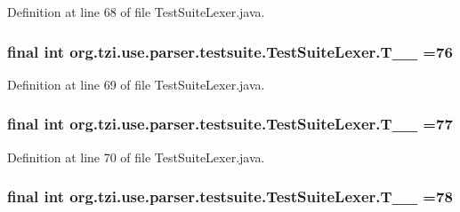 Definition at line 68 of file Test\-Suite\-Lexer.\-java.

\hypertarget{classorg_1_1tzi_1_1use_1_1parser_1_1testsuite_1_1_test_suite_lexer_ad3bca33786a90c2a13844887c53c933f}{
\subsubsection[{T\-\_\-\-\_\-76}]{\setlength{\rightskip}{0pt plus 5cm}final int org.\-tzi.\-use.\-parser.\-testsuite.\-Test\-Suite\-Lexer.\-T\-\_\-\-\_ =76\hspace{0.3cm}{\ttfamily [static]}}}\label{classorg_1_1tzi_1_1use_1_1parser_1_1testsuite_1_1_test_suite_lexer_ad3bca33786a90c2a13844887c53c933f}


Definition at line 69 of file Test\-Suite\-Lexer.\-java.

\hypertarget{classorg_1_1tzi_1_1use_1_1parser_1_1testsuite_1_1_test_suite_lexer_a582bee9084f55732f8d42a01fa2022d9}{
\subsubsection[{T\-\_\-\-\_\-77}]{\setlength{\rightskip}{0pt plus 5cm}final int org.\-tzi.\-use.\-parser.\-testsuite.\-Test\-Suite\-Lexer.\-T\-\_\-\-\_ =77\hspace{0.3cm}{\ttfamily [static]}}}\label{classorg_1_1tzi_1_1use_1_1parser_1_1testsuite_1_1_test_suite_lexer_a582bee9084f55732f8d42a01fa2022d9}


Definition at line 70 of file Test\-Suite\-Lexer.\-java.

\hypertarget{classorg_1_1tzi_1_1use_1_1parser_1_1testsuite_1_1_test_suite_lexer_a9f2087da7d2c3f06e0c1c67f165cfe31}{
\subsubsection[{T\-\_\-\-\_\-78}]{\setlength{\rightskip}{0pt plus 5cm}final int org.\-tzi.\-use.\-parser.\-testsuite.\-Test\-Suite\-Lexer.\-T\-\_\-\-\_ =78\hspace{0.3cm}{\ttfamily [static]}}}\label{classorg_1_1tzi_1_1use_1_1parser_1_1testsuite_1_1_test_suite_lexer_a9f2087da7d2c3f06e0c1c67f165cfe31}


